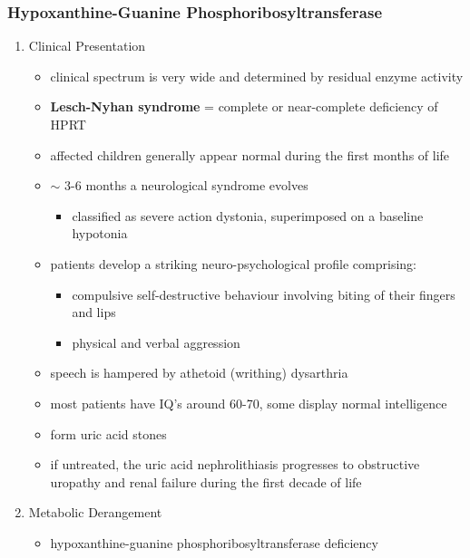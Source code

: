 \documentclass[12pt]{scrartcl}
\begin{document}
\subsubsection{Hypoxanthine-Guanine Phosphoribosyltransferase}
\label{sec:org2ad57b6}
\begin{enumerate}
\item Clinical Presentation
\label{sec:orgfd7cbf4}
\begin{itemize}
\item clinical spectrum is very wide and determined by residual enzyme activity
\item \textbf{Lesch-Nyhan syndrome} = complete or near-complete deficiency of HPRT
\item affected children generally appear normal during the first months of
life
\item \(\sim\) 3-6 months a neurological syndrome evolves
\begin{itemize}
\item classified as severe action dystonia, superimposed on a baseline hypotonia
\end{itemize}
\item patients develop a striking neuro-psychological profile comprising:
\begin{itemize}
\item compulsive self-destructive behaviour involving biting of their
fingers and lips
\item physical and verbal aggression
\end{itemize}
\item speech is hampered by athetoid (writhing) dysarthria
\item most patients have IQ’s around 60-70, some display normal intelligence
\item form uric acid stones
\item if untreated, the uric acid nephrolithiasis progresses to
obstructive uropathy and renal failure during the first decade of
life
\end{itemize}

\item Metabolic Derangement
\label{sec:org3395c71}
\begin{itemize}
\item hypoxanthine-guanine phosphoribosyltransferase deficiency
\end{itemize}




\end{enumerate}
\end{document}
